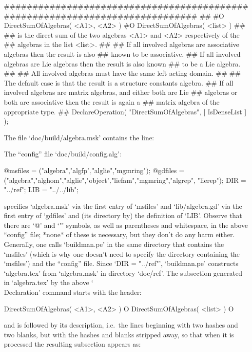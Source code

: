 \begintt
#############################################################################
##
#O  DirectSumOfAlgebras( <A1>, <A2> )
#O  DirectSumOfAlgebras( <list> )
##
##  is the direct sum of the two algebras <A1> and <A2> respectively of the
##  algebras in the list <list>.
##
##  If all involved algebras are associative algebras then the result is also
##  known to be associative.
##  If all involved algebras are Lie algebras then the result is also known
##  to be a Lie algebra.
##
##  All involved algebras must have the same left acting domain.
##
##  The default case is that the result is a structure constants algebra.
##  If all involved algebras are matrix algebras, and either both are Lie
##  algebras or both are associative then the result is again a
##  matrix algebra of the appropriate type.
##
DeclareOperation( "DirectSumOfAlgebras", [ IsDenseList ] );
\endtt

The file `doc/build/algebra.msk' contains the line:

\begintt
{}
\endtt

The ``config'' file `doc/build/config.alg':

\begintt
@msfiles = ("algebra","algfp","alglie","mgmring");
@gdfiles = ("algebra","alghom","alglie","object","liefam","mgmring","algrep",
            "lierep");
DIR = "../ref";
LIB = "../../lib";
\endtt

specifies  `algebra.msk'  via  the   first   entry   of   `msfiles'   and
`lib/algebra.gd' via the first entry of `gdfiles' and (its directory  by)
the definition of `LIB'. Observe that there are `@' and `"'  symbols,  as
well as parentheses and whitespace, in the above ``config'' file;  *none*
of these is necessary, but they don't do any harm either. Generally,  one
calls `buildman.pe' in the same directory  that  contains  the  `msfiles'
(which is why one doesn't need to specify the  directory  containing  the
`msfiles') and the ``config'' file. Since `DIR = "../ref"', `buildman.pe'
constructs `algebra.tex' from `algebra.msk' in directory  `doc/ref'.  The
subsection  generated  in  `algebra.tex'  by  the  above  `\\Declaration'
command starts with the header:

\begintt
\>DirectSumOfAlgebras( <A1>, <A2> ) O
\>DirectSumOfAlgebras( <list> ) O
\endtt

and is followed by its description, i.e.~the  lines  beginning  with  two
hashes and two blanks, but with the hashes and blanks stripped  away,  so
that when it is processed the resulting subsection appears as:

